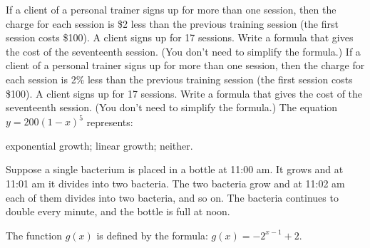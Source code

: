 \documentclass[11pt,answers]{exam}
\begin{document}
\begin{questions}


\addpoints

\question[2] If a client of a personal trainer signs up for more than one session, then the charge for each session is \$2 less than the previous training session (the first session costs \$100). A client signs up for 17 sessions. Write a formula that gives the cost of the seventeenth session. (You don't need to simplify the formula.)
\fillwithdottedlines{2cm}
\question[2] If a client of a personal trainer signs up for more than one session, then the charge for each session is 2\% less than the previous training session (the first session costs \$100). A client signs up for 17 sessions. Write a formula that gives the cost of the seventeenth session. (You don't need to simplify the formula.)
\fillwithdottedlines{2cm}
\question[1] The equation $\displaystyle y=200(1-x)^5$ represents:
\begin{oneparchoices}
\choice exponential growth; \choice linear growth; \choice neither.
\end{oneparchoices}
\question Suppose a single bacterium is placed in a bottle at 11:00 am. It grows
and at 11:01 am it divides into two bacteria. The two bacteria grow
and at 11:02 am each of them divides into two bacteria, and so on. The
bacteria continues to double every minute, and the bottle is full at noon.
\question The function $g(x)$ is defined by the formula: $\displaystyle g(x) = -2^{x-1} + 2$. 

\end{questions}
\end{document}

